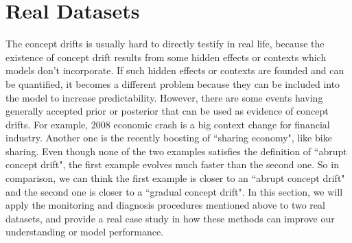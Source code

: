 \documentclass[twoside,11pt]{article}
\begin{document}
\section{Real Datasets}
The concept drifts is usually hard to directly testify in real life, because the existence of concept drift results from some hidden effects or contexts which models don't incorporate. If such hidden effects or contexts are founded and can be quantified, it becomes a different problem because they can be included into the model to increase predictability. However, there are some events having generally accepted prior or posterior that can be used as evidence of concept drifts. For example, $2008$ economic crash is a big context change for financial industry. Another one is the recently boosting of ``sharing economy", like bike sharing. Even though none of the two examples satisfies the definition of ``abrupt concept drift", the first example evolves much faster than the second one. So in comparison, we can think the first example is closer to an ``abrupt concept drift" and the second one is closer to a ``gradual concept drift". In this section, we will apply the monitoring and diagnosis procedures mentioned above to two real datasets, and provide a real case study in how these methods can improve our understanding or model performance.
\end{document}

